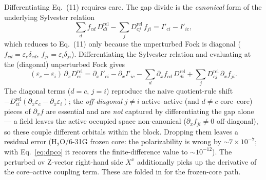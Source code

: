 \documentclass[11pt]{article}
\newcommand{\pd}[1]{\partial_{#1}}
\begin{document}
Differentiating Eq.~(11) requires care. The gap divide is the \emph{canonical} form of the
underlying Sylvester relation
\begin{equation}
  \sum_d f_{cd}\,D^{\mathrm{rel}}_{di} - \sum_j D^{\mathrm{rel}}_{cj}\,f_{ji}
      = I'_{ci}-I'_{ic},
\end{equation}
which reduces to Eq.~(11) only because the unperturbed Fock is diagonal
($f_{cd}=\varepsilon_c\delta_{cd}$, $f_{ji}=\varepsilon_i\delta_{ji}$). Differentiating the
Sylvester relation and evaluating at the (diagonal) unperturbed Fock gives
\begin{equation}
  (\varepsilon_c-\varepsilon_i)\,\pd{x}D^{\mathrm{rel}}_{ci}
      = \pd{x}I'_{ci}-\pd{x}I'_{ic}
        - \sum_d \pd{x}f_{cd}\,D^{\mathrm{rel}}_{di}
        + \sum_j D^{\mathrm{rel}}_{cj}\,\pd{x}f_{ji}.
  \label{eq:dpco}
\end{equation}
The diagonal terms ($d=c$, $j=i$) reproduce the naive quotient-rule shift
$-D^{\mathrm{rel}}_{ci}(\pd{x}\varepsilon_c-\pd{x}\varepsilon_i)$; the \emph{off-diagonal}
$j\neq i$ active--active (and $d\neq c$ core--core) pieces of $\pd{x}f$ are essential and are
\emph{not} captured by differentiating the gap alone --- a field leaves the active occupied
space non-canonical ($\pd{x}f_{ji}\neq 0$ off-diagonal), so these couple different orbitals
within the block. Dropping them leaves a residual error (H$_2$O/6-31G frozen core: the
polarizability is wrong by $\sim\!7\times10^{-7}$; with Eq.~\eqref{eq:dpco} it recovers the
finite-difference value to $\sim\!10^{-12}$). The perturbed ov Z-vector right-hand side $X^x$
additionally picks up the derivative of the core--active coupling term. These are folded in
for the frozen-core path.
\end{document}

